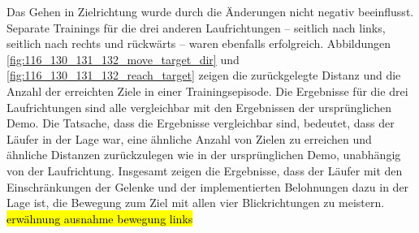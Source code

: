 Das Gehen in Zielrichtung wurde durch die Änderungen nicht negativ beeinflusst. Separate Trainings für die drei anderen Laufrichtungen – seitlich nach links, seitlich nach rechts und rückwärts – waren ebenfalls erfolgreich. Abbildungen \ref{fig:116_130_131_132_move_target_dir} und \ref{fig:116_130_131_132_reach_target} zeigen die zurückgelegte Distanz und die Anzahl der erreichten Ziele in einer Trainingsepisode. Die Ergebnisse für die drei Laufrichtungen sind alle vergleichbar mit den Ergebnissen der ursprünglichen Demo. Die Tatsache, dass die Ergebnisse  \grqq{}vergleichbar \grqq{} sind, bedeutet, dass der Läufer in der Lage war, eine ähnliche Anzahl von Zielen zu erreichen und ähnliche Distanzen zurückzulegen wie in der ursprünglichen Demo, unabhängig von der Laufrichtung. Insgesamt zeigen die Ergebnisse, dass der Läufer mit den Einschränkungen der Gelenke und der implementierten Belohnungen dazu in der Lage ist, die Bewegung zum Ziel mit allen vier Blickrichtungen zu meistern. \hl{erwähnung ausnahme bewegung links}

